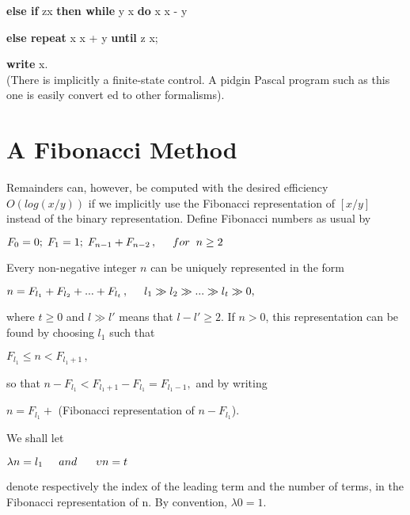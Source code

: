 \documentclass{article}
\begin{document}
\begin{multicols}{3}
{\begin{minipage}[t]{.96\linewidth}
    \hspace {.5cm}\textbf{else if } z\geq   x\; \textbf{then while } y \geq  x\; \textbf{do }	x \leftarrow x - y
    
    \hspace {1.5cm}\textbf{else repeat } x \leftarrow  x + y \;\textbf{until } z \geq x;
    
    \hspace {.5cm}\textbf{write } x.\\
    (There is implicitly a finite-state control. A pidgin Pascal program such as this one is easily convert ed to other formalisms).
        \vspace{.2cm}
      \end{minipage}
    }
    


\section*{A Fibonacci Method}

Remainders can, however, be computed with the desired efficiency $O(log(x/y))$ if we implicitly use the Fibonacci representation of $[x/y]$ instead of the binary representation. Define Fibonacci numbers as usual by\\
\begin{center}
    $F_{0}=0;\; F_{1}=1;\; F_{n-1}+F_{n-2}\,, \hspace{.5cm} for\;\; n\geq 2$\\
\end{center}
Every non-negative integer $n$ can be uniquely represented in the form
\begin{center}
    $n=F_{l_{1}}+F_{l_{2}}+...+F_{l_{t}}\,, \hspace{.5cm} l_{1}\gg l_{2}\gg...\gg l_{t}\gg 0,$
\end{center}
where $t \geq  0$ and $l \gg  l'$ means that $l - l'\geq 2$. If $n > 0$, this representation can be found by choosing $l_{1}$ such that
\begin{center}
    $F_{l_{1}}\leq n< F_{l_{1}+1}\,,$
\end{center}
so that $n-F_{l_{1}}<  F_{l_{1}+1}-F_{l_{1}}=F_{l_{1}-1},$ and by writing
\begin{center}
    $n=F_{l_{1}}+$ (Fibonacci representation of $n-F_{l_{1}}$).
\end{center}
We shall let\\
\begin{center}
    $\lambda n=l_{1} \hspace{.5cm} and \hspace{.5cm}\; \upsilon n=t$
\end{center}
denote respectively the index of the leading term and the number of terms, in the Fibonacci representation of n. By convention, $\lambda0=1$.\\


\end{multicols}
\end{document}
